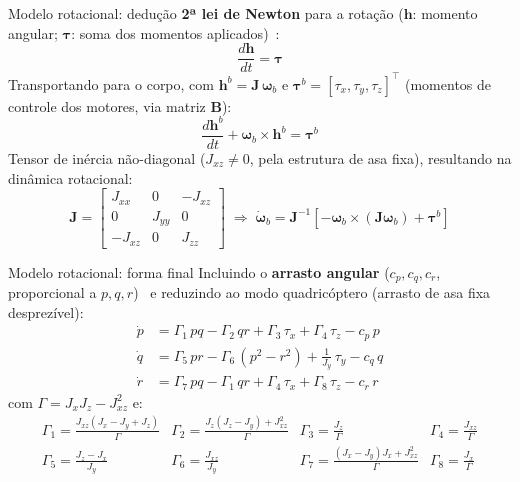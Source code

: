\documentclass[aspectratio=169,11pt]{beamer}
\begin{document}
\begin{frame}{Modelo rotacional: dedução}
  \textbf{2ª lei de Newton} para a rotação ($\mathbf{h}$: momento angular; $\boldsymbol\tau$: soma dos momentos aplicados)~\cite{Beard2012}:
  \begin{equation}\frac{d\mathbf{h}}{dt}=\boldsymbol\tau\tag{2.16}\end{equation}
  Transportando para o corpo, com $\mathbf{h}^{b}=\mathbf{J}\,\boldsymbol\omega_b$ e $\boldsymbol\tau^{b}=[\tau_x,\tau_y,\tau_z]^{\top}$ (momentos de controle dos motores, via matriz $\mathbf{B}$):
  \begin{equation}\frac{d\mathbf{h}^{b}}{dt}+\boldsymbol\omega_b\times\mathbf{h}^{b}=\boldsymbol\tau^{b}\tag{2.17}\end{equation}
  Tensor de inércia \alert{não-diagonal} ($J_{xz}\neq 0$, pela estrutura de asa fixa), resultando na dinâmica rotacional:
  \begin{equation}
    \mathbf{J}=\begin{bmatrix} J_{xx} & 0 & -J_{xz} \\ 0 & J_{yy} & 0 \\ -J_{xz} & 0 & J_{zz} \end{bmatrix}
    \;\Rightarrow\;
    \dot{\boldsymbol\omega}_b=\mathbf{J}^{-1}\!\left[-\boldsymbol\omega_b\times(\mathbf{J}\boldsymbol\omega_b)+\boldsymbol\tau^{b}\right]
    \tag{2.20}
  \end{equation}
\end{frame}

\begin{frame}{Modelo rotacional: forma final}
  Incluindo o \textbf{arrasto angular} ($c_p,c_q,c_r$, proporcional a $p,q,r$)~\cite{Quan2017} e reduzindo ao modo quadricóptero (arrasto de asa fixa desprezível):
  \begin{align*}
    \dot{p} &= \Gamma_1\,pq - \Gamma_2\,qr + \Gamma_3\,\tau_x + \Gamma_4\,\tau_z - c_p\,p \tag{2.22}\\
    \dot{q} &= \Gamma_5\,pr - \Gamma_6\,(p^2 - r^2) + \tfrac{1}{J_y}\,\tau_y - c_q\,q \tag{2.23}\\
    \dot{r} &= \Gamma_7\,pq - \Gamma_1\,qr + \Gamma_4\,\tau_x + \Gamma_8\,\tau_z - c_r\,r \tag{2.24}
  \end{align*}
  \footnotesize com $\Gamma = J_x J_z - J_{xz}^{2}$ e:
  \[
    \begin{array}{llll}
      \Gamma_1=\tfrac{J_{xz}(J_x-J_y+J_z)}{\Gamma} &
      \Gamma_2=\tfrac{J_z(J_z-J_y)+J_{xz}^2}{\Gamma} &
      \Gamma_3=\tfrac{J_z}{\Gamma} &
      \Gamma_4=\tfrac{J_{xz}}{\Gamma} \\[4pt]
      \Gamma_5=\tfrac{J_z-J_x}{J_y} &
      \Gamma_6=\tfrac{J_{xz}}{J_y} &
      \Gamma_7=\tfrac{(J_x-J_y)J_x+J_{xz}^2}{\Gamma} &
      \Gamma_8=\tfrac{J_x}{\Gamma}
    \end{array}
  \]
\end{frame}
\end{document}
